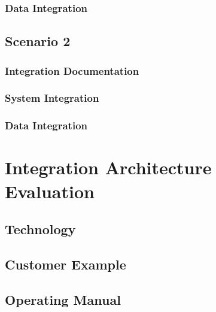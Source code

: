 \documentclass[
     12pt,         %
     a4paper,      %
     BCOR10mm,     %
     DIV14,        %
     ]{scrreprt}
\begin{document}
\subsection{Data Integration}

\section{Scenario 2}

\subsection{Integration Documentation}

\subsection{System Integration}

\subsection{Data Integration}

\chapter{Integration Architecture Evaluation}

\section{Technology}

\section{Customer Example}

\section{Operating Manual}



\end{document}
